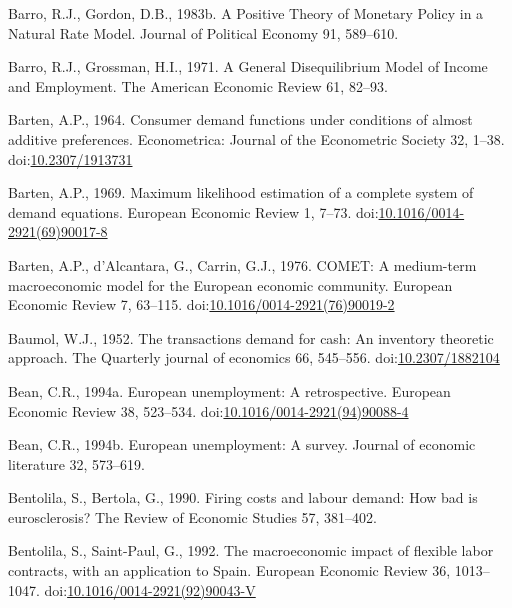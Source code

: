 \documentclass[
  12pt,
  onecolumn]{article}
\newlength{\cslhangindent}
\newlength{\cslentryspacingunit} %
\newenvironment{CSLReferences}[2] %
 {%
  \setlength{\parindent}{0pt}
  \ifodd #1
  \let\oldpar\par
  \def\par{\hangindent=\cslhangindent\oldpar}
  \fi
  \setlength{\parskip}{#2\cslentryspacingunit}
 }%
 {}
\begin{document}
\begin{CSLReferences}{1}{0}
\leavevmode{}%
Barro, R.J., Gordon, D.B., 1983b. A {Positive Theory} of {Monetary Policy} in a {Natural Rate Model}. Journal of Political Economy 91, 589--610.

\leavevmode{}%
Barro, R.J., Grossman, H.I., 1971. A {General Disequilibrium Model} of {Income} and {Employment}. The American Economic Review 61, 82--93.

\leavevmode{}%
Barten, A.P., 1964. Consumer demand functions under conditions of almost additive preferences. Econometrica: Journal of the Econometric Society 32, 1--38. doi:\href{https://doi.org/10.2307/1913731}{10.2307/1913731}

\leavevmode{}%
Barten, A.P., 1969. Maximum likelihood estimation of a complete system of demand equations. European Economic Review 1, 7--73. doi:\href{https://doi.org/10.1016/0014-2921(69)90017-8}{10.1016/0014-2921(69)90017-8}

\leavevmode{}%
Barten, A.P., d'Alcantara, G., Carrin, G.J., 1976. {COMET}: {A} medium-term macroeconomic model for the {European} economic community. European Economic Review 7, 63--115. doi:\href{https://doi.org/10.1016/0014-2921(76)90019-2}{10.1016/0014-2921(76)90019-2}

\leavevmode{}%
Baumol, W.J., 1952. The transactions demand for cash: {An} inventory theoretic approach. The Quarterly journal of economics 66, 545--556. doi:\href{https://doi.org/10.2307/1882104}{10.2307/1882104}

\leavevmode{}%
Bean, C.R., 1994a. European unemployment: {A} retrospective. European Economic Review 38, 523--534. doi:\href{https://doi.org/10.1016/0014-2921(94)90088-4}{10.1016/0014-2921(94)90088-4}

\leavevmode{}%
Bean, C.R., 1994b. European unemployment: A survey. Journal of economic literature 32, 573--619.

\leavevmode{}%
Bentolila, S., Bertola, G., 1990. Firing costs and labour demand: How bad is eurosclerosis? The Review of Economic Studies 57, 381--402.

\leavevmode{}%
Bentolila, S., Saint-Paul, G., 1992. The macroeconomic impact of flexible labor contracts, with an application to {Spain}. European Economic Review 36, 1013--1047. doi:\href{https://doi.org/10.1016/0014-2921(92)90043-V}{10.1016/0014-2921(92)90043-V}


\end{CSLReferences}
\end{document}
